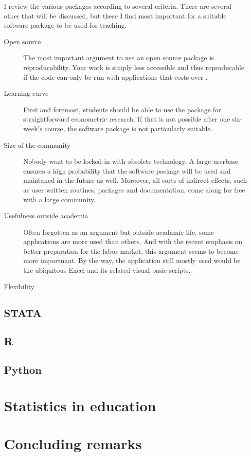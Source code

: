 \documentclass[fleqn,10pt]{SelfArx} %
\begin{document}
I review the various packages according to several criteria. There are several
other that will be discussed, but these I find most important for a suitable
software package to be used for teaching. 
\begin{description}
\item[Open source] The most important argument to use an open source package is
  reproducability. Your work is simply less accessible and thus reproducable if
  the code can only be run with applications that costs over . 
\item[Learning curve] First and foremost, students should be able to use the
  package for straightforward econometric research. If that is not possible
  after one six-week's course, the software package is not particularly
  suitable. 
\item[Size of the community] Nobody want to be locked in with obsolete
  technology. A large userbase ensures a high probability that the software
  package will be used and maintaned in the future as well. Moreover, all sorts
  of indirect effects, such as user written routines, packages and
  documentation, come along for free with a large community. 
\item[Usefulness outside academia] Often forgotten as an argument but outside
  acadamic life, some applications are more used than others. And with the
  recent emphasis on better preparation for the labor market, this argument
  seems to become more importnant. By the way, the
  application still mostly used would be the ubiquitous Excel and its related
  visual basic scripts.
\item[Flexibility]
\end{description}

\subsection*{STATA}

\subsection*{R}

\subsection*{Python}

\section*{Statistics in education}

\section*{Concluding remarks}


\printbibliography

\end{document}
